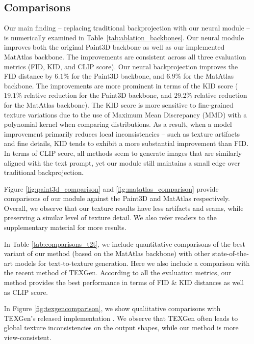 \subsection{Comparisons}
\label{subsec:comparisons}

Our main finding -- replacing traditional backprojection with our neural module -- is numerically examined in Table~\ref{tab:ablation_backbones}. Our neural module improves both the original Paint3D backbone as well as our implemented MatAtlas backbone. The improvements are consistent across all three evaluation metrics (FID, KID, and CLIP score). Our neural backprojection improves the FID distance by $6.1\%$ for the Paint3D backbone, and $6.9\%$ for the MatAtlas backbone. The improvements are more prominent in terms of the KID score ($19.1\%$ relative reduction for the Paint3D backbone, and $29.2\%$ relative reduction for the MatAtlas backbone). The KID score is more sensitive to fine-grained texture variations due to the use of Maximum Mean Discrepancy (MMD) with a polynomial kernel when comparing distributions. As a result, when a model improvement primarily reduces local inconsistencies -- such as texture artifacts and fine details, KID tends to exhibit a more substantial improvement than FID. In terms of CLIP score, all methods seem to generate images that are similarly aligned with the text prompt, yet our module still maintains a small edge over traditional backprojection. 


Figure \ref{fig:paint3d_comparison} and \ref{fig:matatlas_comparison} 
provide comparisons of our module against the Paint3D and MatAtlas respectively. Overall, we observe that our texture results have less artifacts and seams, while preserving a similar level of texture detail. We also refer readers to the supplementary material for more results. 

In Table \ref{tab:comparisons_t2t}, we include quantitative comparisons of the best variant of our method (based on the MatAtlas backbone) with other state-of-the-art models for text-to-texture generation. Here we also include a comparison with the recent method of TEXGen\cite{Yu:2024:TEXGen}.
According to all the evaluation metrics, our method provides the best performance in terms of FID \& KID distances as well as CLIP score.  

In Figure \ref{fig:texgencomparison}, we show qualiitative comparisons with 
TEXGen's released implementation \cite{Yu:2024:TEXGen}. We observe that TEXGen often leads to global texture inconsistencies on the output shapes, while our method is  more view-consistent.



